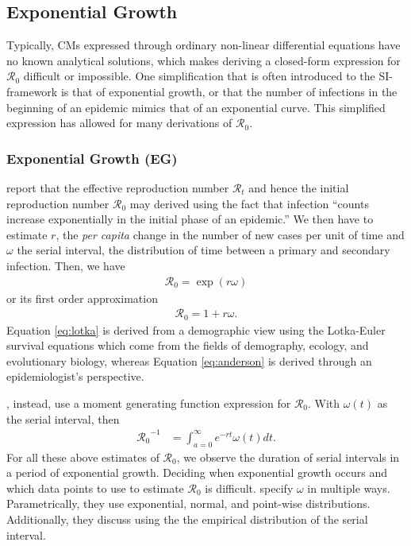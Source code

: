\documentclass[12pt]{article}
\newcommand{\rr}{\ensuremath{\mathcal{R}_0}}
\begin{document}

\subsection{Exponential Growth}\label{sec:exp-growth}
Typically, CMs expressed through ordinary non-linear differential equations have no known analytical solutions, which makes deriving a closed-form expression for $\rr$ difficult or impossible.  One simplification that is often introduced to the SI-framework is that of exponential growth, or that the number of infections in the beginning of an epidemic mimics that of an exponential curve.  This simplified expression has allowed for many derivations of $\rr$.


\subsubsection{Exponential Growth (EG)}
\label{sec:expgrowth}
\cite{wallinga2007generation} report that the effective reproduction number $\mathcal{R}_t$ and hence the initial reproduction number $\rr$ may derived using the fact that infection ``counts increase exponentially in the initial phase of an epidemic.''  We then have to estimate $r$, the \textit{per capita} change in the number of new cases per unit of time and $\omega$ the serial interval, the distribution of time between a primary and secondary infection. Then, we have
\begin{align}\label{eq:lotka}
\rr = \exp{(r \omega)}
\end{align}
or its first order approximation
\begin{align}\label{eq:anderson}
\rr = 1 + r \omega.
\end{align}
Equation \eqref{eq:lotka} is derived from a demographic view using the Lotka-Euler survival equations which come from the fields of demography, ecology, and evolutionary biology, whereas Equation \eqref{eq:anderson} is derived through an epidemiologist's perspective. 

\cite{wallinga2007generation}, instead, use a moment generating function expression for $\rr$.  With $\omega(t)$ as the serial interval, then
\begin{align*}
\rr^{-1} &= \int_{a=0}^\infty e^{-rt}\omega(t)dt.
\end{align*}
For all these above estimates of $\rr$, we observe the duration of serial intervals in a period of exponential growth.  Deciding when exponential growth occurs and which data points to use to estimate $\rr$ is difficult.  \citeauthor{wallinga2007generation} specify $\omega$ in multiple ways.  Parametrically, they use exponential, normal, and point-wise distributions.  Additionally, they discuss using the the empirical distribution of the serial interval.
\end{document}
